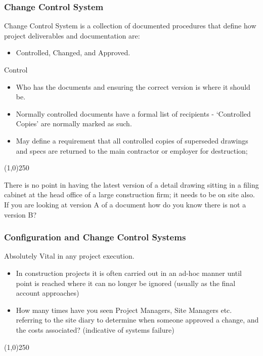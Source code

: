 \begin{frame}
\frametitle{Change Control System}
Change Control System is a collection of documented procedures that define how project deliverables and documentation are:
\begin{itemize}
	\item Controlled, Changed, and Approved.
\end{itemize}
Control 
\begin{itemize}
	\item Who has the documents and ensuring the correct version is where it should be.
	\item Normally controlled documents have a formal list of recipients - `Controlled Copies' are normally marked as such. 
	\item May define a requirement that all controlled copies of superseded drawings and specs are returned to the main contractor or employer for destruction;  
\end{itemize}
\end{frame}\begin{center}\line(1,0){250}\end{center}
There is no point in having the latest version of a detail drawing sitting in a filing cabinet at the head office of a large construction firm; it needs to be on site also. If you are looking at version A of a document how do you know there is not a version B?
%

\begin{frame}
\frametitle{Configuration and Change Control Systems}
Absolutely Vital in any project execution.\\
\begin{itemize}
	\item In construction projects it is often carried out in an ad-hoc manner until point is reached where it can no longer be ignored (usually as the final account approaches)\\
	\item How many times have you seen Project Managers, Site Managers etc. referring to the site diary to determine when someone approved a change, and the costs associated? (indicative of systems failure)
\end{itemize}
\end{frame}\begin{center}\line(1,0){250}\end{center}
%
%


